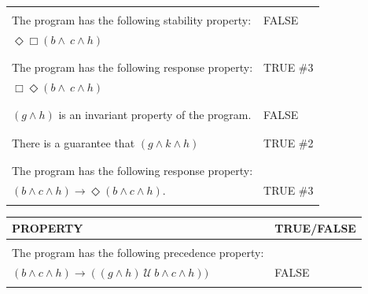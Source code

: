 \documentclass[12pt]{article}
\begin{document}
\begin{enumerate}
\begin{table}
\begin{tabular}{|l|l|}
&\\

\hline

&\\

The program has the following stability property: &FALSE\\
$\Diamond \Box (b \wedge \ c \wedge h)$		 &\\

&\\

\hline

&\\

The program has the following response property: &TRUE \#3\\
$\Box \Diamond (b \wedge \ c \wedge h)$		 &\\

&\\

\hline

&\\

$( g \wedge h)$ is an invariant property of the program.  &FALSE\\

&\\

\hline

&\\

There is a guarantee that $(g \wedge k \wedge h)$	 &TRUE \#2\\

&\\

\hline

&\\

The program has the following response property: &\\
$(b \wedge c \wedge h) \rightarrow \Diamond (b \wedge c \wedge h)$.   &TRUE \#3\\

&\\

\hline

\end{tabular}
\end{table}

\newpage

\begin{table}
	\centering
	\begin{tabular}{|l|l|}
	\hline
	\textbf{PROPERTY}							& \textbf{TRUE/FALSE}\\
	\hline
	&\\

The program has the following precedence property: &\\
$(b \wedge c \wedge h) \rightarrow ( (g \wedge h) ~\mathcal{U}~ b \wedge c \wedge h))$
			 &FALSE\\
&\\

\hline
\end{tabular}
\end{table}

\end{enumerate}
\end{document}

